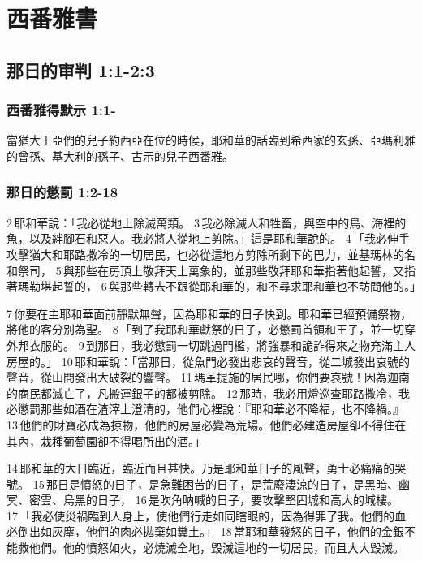 


\vspace{-5mm}
\chapter{西番雅書}
\vspace{-3mm}

\section{那日的审判 1:1-2:3}


\subsection{西番雅得默示 1:1-}
當猶大王亞們的兒子約西亞在位的時候，耶和華的話臨到希西家的玄孫、亞瑪利雅的曾孫、基大利的孫子、古示的兒子西番雅。

\subsection{那日的懲罰 1:2-18}
2 耶和華說：「我必從地上除滅萬類。 3 我必除滅人和牲畜，與空中的鳥、海裡的魚，以及絆腳石和惡人。我必將人從地上剪除。」這是耶和華說的。 4 「我必伸手攻擊猶大和耶路撒冷的一切居民，也必從這地方剪除所剩下的巴力，並基瑪林的名和祭司， 5 與那些在房頂上敬拜天上萬象的，並那些敬拜耶和華指著他起誓，又指著瑪勒堪起誓的， 6 與那些轉去不跟從耶和華的，和不尋求耶和華也不訪問他的。」

7 你要在主耶和華面前靜默無聲，因為耶和華的日子快到。耶和華已經預備祭物，將他的客分別為聖。 8 「到了我耶和華獻祭的日子，必懲罰首領和王子，並一切穿外邦衣服的。 9 到那日，我必懲罰一切跳過門檻，將強暴和詭詐得來之物充滿主人房屋的。」 10 耶和華說：「當那日，從魚門必發出悲哀的聲音，從二城發出哀號的聲音，從山間發出大破裂的響聲。 11 瑪革提施的居民哪，你們要哀號！因為迦南的商民都滅亡了，凡搬運銀子的都被剪除。 12 那時，我必用燈巡查耶路撒冷，我必懲罰那些如酒在渣滓上澄清的，他們心裡說：『耶和華必不降福，也不降禍。』 13 他們的財寶必成為掠物，他們的房屋必變為荒場。他們必建造房屋卻不得住在其內，栽種葡萄園卻不得喝所出的酒。」

14 耶和華的大日臨近，臨近而且甚快。乃是耶和華日子的風聲，勇士必痛痛的哭號。 15 那日是憤怒的日子，是急難困苦的日子，是荒廢淒涼的日子，是黑暗、幽冥、密雲、烏黑的日子， 16 是吹角呐喊的日子，要攻擊堅固城和高大的城樓。 17 「我必使災禍臨到人身上，使他們行走如同瞎眼的，因為得罪了我。他們的血必倒出如灰塵，他們的肉必拋棄如糞土。」 18 當耶和華發怒的日子，他們的金銀不能救他們。他的憤怒如火，必燒滅全地，毀滅這地的一切居民，而且大大毀滅。

